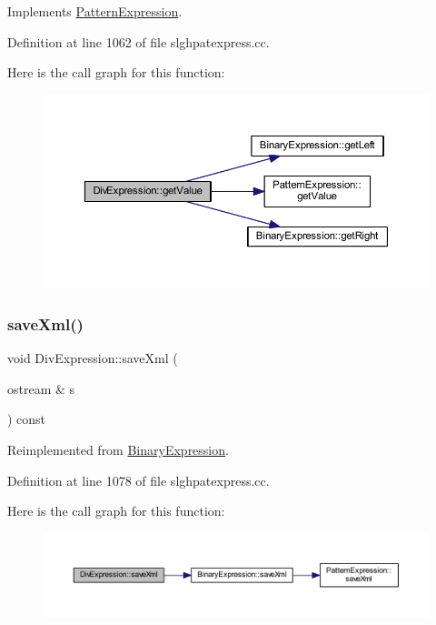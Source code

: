 Implements \mbox{\hyperlink{class_pattern_expression_a8332c6ea4c5a7e9dfc690df2a6458bb8}{Pattern\+Expression}}.



Definition at line 1062 of file slghpatexpress.\+cc.

Here is the call graph for this function\+:
\nopagebreak
\begin{figure}[H]
\begin{center}
\leavevmode
\includegraphics[width=350pt]{class_div_expression_ab7f9f33b65f50d8b246ab69694cbf150_cgraph}
\end{center}
\end{figure}
\mbox{\label{class_div_expression_ac366efa9af2e0a858b06e1a8e3479aa9}} 
\subsubsection{\texorpdfstring{saveXml()}{saveXml()}}
{\footnotesize\ttfamily void Div\+Expression\+::save\+Xml (\begin{DoxyParamCaption}\item[{ostream \&}]{s }\end{DoxyParamCaption}) const\hspace{0.3cm}{\ttfamily [virtual]}}



Reimplemented from \mbox{\hyperlink{class_binary_expression_a4b9e768a619b713d6c1ff35a618d98ec}{Binary\+Expression}}.



Definition at line 1078 of file slghpatexpress.\+cc.

Here is the call graph for this function\+:
\nopagebreak
\begin{figure}[H]
\begin{center}
\leavevmode
\includegraphics[width=350pt]{class_div_expression_ac366efa9af2e0a858b06e1a8e3479aa9_cgraph}
\end{center}
\end{figure}


